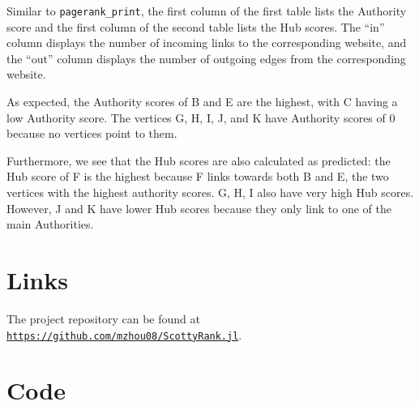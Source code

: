 \documentclass[12pt, titlepage, twoside]{amsart}
\begin{document}
Similar to \texttt{pagerank_print}, the first column
of the first table lists the Authority score
and the first column of the second table lists the Hub scores.
The ``in'' column displays the number of incoming links to the corresponding website,
and the ``out'' column displays the number of outgoing edges from the corresponding website.

As expected, the Authority scores of B and E are the highest, with C having a low Authority score.
The vertices G, H, I, J, and K have Authority scores of 0 because no vertices point to them.

Furthermore, we see that the Hub scores are also calculated as predicted:
the Hub score of F is the highest because F links towards both B and E,
the two vertices with the highest authority scores. G, H, I also
have very high Hub scores. However, J and K have lower Hub scores because they only link to one of the main Authorities.




\appendix

\section{Links}

The project repository can be found at
\href{https://github.com/mzhou08/ScottyRank.jl}{\texttt{https://github.com/mzhou08/ScottyRank.jl}}.

\section{Code}

\inputminted{julia}{../src/ScottyRank.jl}
\end{document}
